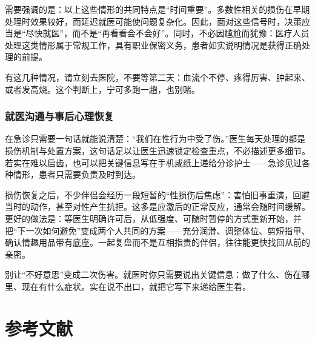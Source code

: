 \documentclass[12pt,UTF8]{ctexbook}
\begin{document}
需要强调的是：以上这些情形的共同特点是“时间重要”。多数性相关的损伤在早期处理时效果较好，而延迟就医可能使问题复杂化。因此，面对这些信号时，决策应当是“尽快就医”，而不是“再看看会不会好”。同时，不必因尴尬而犹豫：医疗人员处理这类情形属于常规工作，具有职业保密义务，患者如实说明情况是获得正确处理的前提。

\begin{tcolorbox}[colback=pink!5!white,colframe=red!50!black,title=贴心小叮咛]
有这几种情况，请立刻去医院，不要等第二天：血流个不停、疼得厉害、肿起来、或者发高烧。这个判断上，宁可多跑一趟，也别赌。
\end{tcolorbox}

\subsection{就医沟通与事后心理恢复}

在急诊只需要一句话就能说清楚：“我们在性行为中受了伤。”医生每天处理的都是损伤机制与处置方案，这句话足以让医生迅速锁定检查重点，不必描述更多细节。若实在难以启齿，也可以把关键信息写在手机或纸上递给分诊护士——急诊见过各种情形，患者只需要负责及时到达。

损伤恢复之后，不少伴侣会经历一段短暂的“性损伤后焦虑”：害怕旧事重演，回避当时的动作，甚至对性产生抗拒。这多是应激后的正常反应，通常会随时间缓解。更好的做法是：等医生明确许可后，从低强度、可随时暂停的方式重新开始，并把“下一次如何避免”变成两个人共同的方案——充分润滑、调整体位、剪短指甲、确认情趣用品带有底座。一起复盘而不是互相指责的伴侣，往往能更快找回从前的亲密。

\begin{tcolorbox}[colback=pink!5!white,colframe=red!50!black,title=贴心小叮咛]
别让“不好意思”变成二次伤害。就医时你只需要说出关键信息：做了什么、伤在哪里、现在有什么症状。实在说不出口，就把它写下来递给医生看。
\end{tcolorbox}

\backmatter


\chapter{参考文献}

\nocite{*}


\printindex
\end{document}
